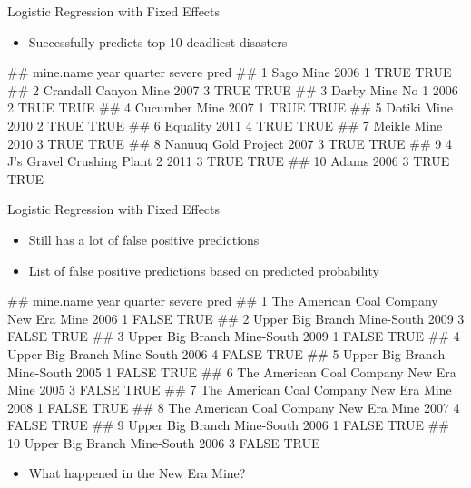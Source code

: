 \documentclass[
]{beamer}
\providecommand{\tightlist}{%
  \setlength{\itemsep}{0pt}\setlength{\parskip}{0pt}}
\let\oldverbatim\verbatim
\let\endoldverbatim\endverbatim
\renewenvironment{verbatim}{\footnotesize\oldverbatim}{\endoldverbatim}
\begin{document}
\begin{frame}[fragile]{Logistic Regression with Fixed Effects}

\begin{itemize}
\tightlist
\item
  Successfully predicts top 10 deadliest disasters
\end{itemize}

\begin{verbatim}
##                        mine.name year quarter severe pred
## 1                      Sago Mine 2006       1   TRUE TRUE
## 2           Crandall Canyon Mine 2007       3   TRUE TRUE
## 3                Darby Mine No 1 2006       2   TRUE TRUE
## 4                  Cucumber Mine 2007       1   TRUE TRUE
## 5                    Dotiki Mine 2010       2   TRUE TRUE
## 6                       Equality 2011       4   TRUE TRUE
## 7                    Meikle Mine 2010       3   TRUE TRUE
## 8            Nanuuq Gold Project 2007       3   TRUE TRUE
## 9  4 J's Gravel Crushing Plant 2 2011       3   TRUE TRUE
## 10                         Adams 2006       3   TRUE TRUE
\end{verbatim}

\end{frame}

\begin{frame}[fragile]{Logistic Regression with Fixed Effects}

\begin{itemize}
\tightlist
\item
  Still has a lot of false positive predictions
\item
  List of false positive predictions based on predicted probability
\end{itemize}

\begin{verbatim}
##                                 mine.name year quarter severe pred
## 1  The American Coal Company New Era Mine 2006       1  FALSE TRUE
## 2             Upper Big Branch Mine-South 2009       3  FALSE TRUE
## 3             Upper Big Branch Mine-South 2009       1  FALSE TRUE
## 4             Upper Big Branch Mine-South 2006       4  FALSE TRUE
## 5             Upper Big Branch Mine-South 2005       1  FALSE TRUE
## 6  The American Coal Company New Era Mine 2005       3  FALSE TRUE
## 7  The American Coal Company New Era Mine 2008       1  FALSE TRUE
## 8  The American Coal Company New Era Mine 2007       4  FALSE TRUE
## 9             Upper Big Branch Mine-South 2006       1  FALSE TRUE
## 10            Upper Big Branch Mine-South 2006       3  FALSE TRUE
\end{verbatim}

\begin{itemize}
\tightlist
\item
  What happened in the New Era Mine?
\end{itemize}

\end{frame}
\end{document}
